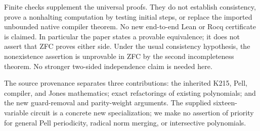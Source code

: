\documentclass[11pt]{article}
\theoremstyle{remark}\newtheorem{remark}[theorem]{Remark}
\begin{document}
Finite checks supplement the universal proofs. They do not establish
consistency, prove a nonhalting computation by testing initial steps, or
replace the imported unbounded native compiler theorem. No new end-to-end
Lean or Rocq certificate is claimed. In particular the paper states a
provable equivalence; it does not assert that ZFC proves either side. Under
the usual consistency hypothesis, the nonexistence assertion is unprovable
in ZFC by the second incompleteness theorem. No stronger two-sided
independence claim is needed here.

The source provenance separates three contributions: the inherited K215,
Pell, compiler, and Jones mathematics; exact refactorings of existing
polynomials; and the new guard-removal and parity-weight arguments.
The supplied sixteen-variable circuit is a concrete new specialization;
we make no assertion of priority for general Pell periodicity, radical norm
merging, or intersective polynomials.
\end{document}

